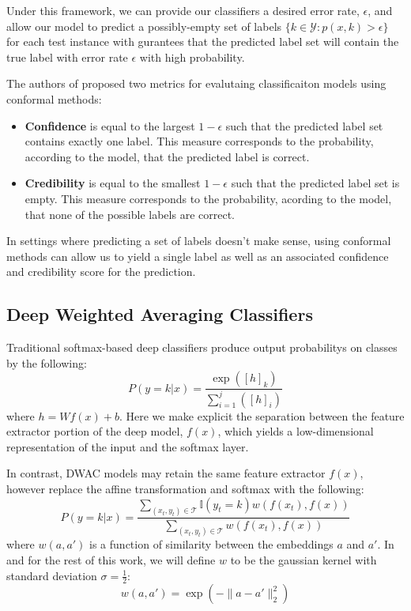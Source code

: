 \documentclass[11pt,letterpaper]{article}
\newcommand{\mc}{\mathcal}
\newcommand{\I}{\mathbb{I}}
\begin{document}
Under this framework, we can provide our classifiers a desired error rate, $\epsilon$, and allow our model to predict a possibly-empty set of labels $\{k \in \mc{Y} : p(x, k) > \epsilon\}$ for each test instance with gurantees that the predicted label set will contain the true label with error rate $\epsilon$ with high probability.

The authors of \citet{saunders.1999} proposed two metrics for evalutaing classificaiton models using conformal methods:
\begin{itemize}
\item\textbf{Confidence} is equal to the largest $1 - \epsilon$ such that the predicted label set
  contains exactly one label. This measure corresponds to the probability, according to the model, that the predicted label is correct.
\item \textbf{Credibility} is equal to the smallest $1 - \epsilon$ such that the predicted label set is empty. This measure corresponds to the probability, acording to the model, that none of the possible labels are correct.
\end{itemize}

In settings where predicting a set of labels doesn't make sense, using conformal methods can allow us to yield a single label as well as an associated confidence and credibility score for the prediction.

\subsection{Deep Weighted Averaging Classifiers}
Traditional softmax-based deep classifiers produce output probabilitys on classes by the following:
\begin{equation}
  P(y = k | x) = \frac{\exp([h]_k)}{\sum_{i=1}^j([h]_i)}
\end{equation}
where $h = W f(x) + b$. Here we make explicit the separation between the feature extractor portion of the deep model, $f(x)$, which yields a low-dimensional representation of the input and the softmax layer.

In contrast, DWAC models may retain the same feature extractor $f(x)$, however replace the affine transformation and softmax with the following:
\begin{equation} \label{dwac:probs}
  P(y = k | x) = \frac{\sum_{(x_t, y_t) \in \mc{T}} \I(y_t = k) w(f(x_t), f(x))}{\sum_{(x_t, y_t) \in \mc{T}} w(f(x_t), f(x))}
\end{equation}
where $w(a, a')$ is a function of similarity between the embeddings $a$ and $a'$. In \citet{card.2019} and for the rest of this work, we will define $w$ to be the gaussian kernel with standard deviation $\sigma = \frac{1}{2}$:
\begin{equation}
  w(a, a') = \exp(- \| a - a' \|_2^2)
\end{equation}
\end{document}
